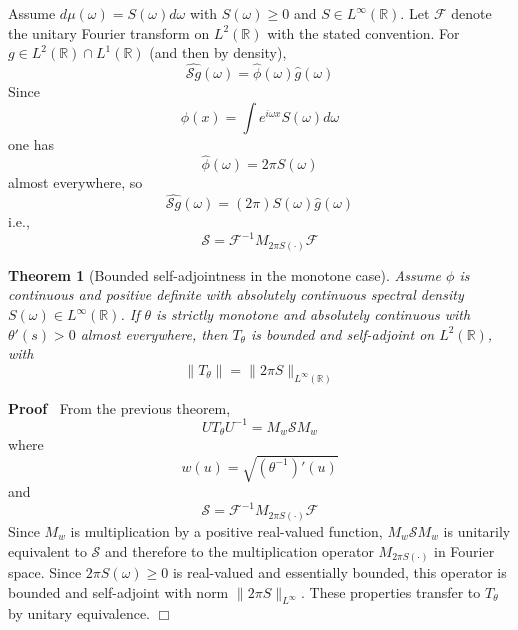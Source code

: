 \documentclass{article}
\newcommand{\cdummy}{\cdot}
\newenvironment{proof}{\noindent\textbf{Proof\ }}{\hspace*{\fill}$\Box$\medskip}
{\theorembodyfont{\rmfamily}\newtheorem{example}{Example}}
\newtheorem{theorem}{Theorem}
\begin{document}
Assume $d \mu (\omega) = S (\omega) d \omega$ with $S (\omega) \ge 0$ and $S
\in L^{\infty} (\mathbb{R})$. Let $\mathcal{F}$ denote the unitary Fourier
transform on $L^2 (\mathbb{R})$ with the stated convention. For $g \in L^2
(\mathbb{R}) \cap L^1 (\mathbb{R})$ (and then by density),
\begin{equation}
  \widehat{\mathcal{S}g} (\omega) = \hat{\phi} (\omega)  \hat{g} (\omega)
\end{equation}
Since
\begin{equation}
  \phi (x) = \int e^{i \omega x} S (\omega) d \omega
\end{equation}
one has
\begin{equation}
  \hat{\phi} (\omega) = 2 \pi S (\omega)
\end{equation}
almost everywhere, so
\begin{equation}
  \widehat{\mathcal{S}g} (\omega) = (2 \pi) S (\omega)  \hat{g} (\omega)
\end{equation}
i.e.,
\begin{equation}
  \mathcal{S}=\mathcal{F}^{- 1} M_{2 \pi S (\cdummy)} \mathcal{F}
\end{equation}
\begin{theorem}[Bounded self-adjointness in the monotone case]
  Assume $\phi$ is continuous and positive definite with absolutely continuous
  spectral density $S (\omega) \in L^{\infty} (\mathbb{R})$. If $\theta$ is
  strictly monotone and absolutely continuous with $\theta' (s) > 0$ almost
  everywhere, then $T_{\theta}$ is bounded and self-adjoint on $L^2
  (\mathbb{R})$, with
  \begin{equation}
    \|T_{\theta} \| = \|2 \pi S\|_{L^{\infty} (\mathbb{R})}
  \end{equation}
\end{theorem}

\begin{proof}
  From the previous theorem,
  \begin{equation}
    UT_{\theta} U^{- 1} = M_w \mathcal{S}M_w
  \end{equation}
  where
  \begin{equation}
    w (u) = \sqrt{(\theta^{- 1})' (u)}
  \end{equation}
  and
  \begin{equation}
    \mathcal{S}=\mathcal{F}^{- 1} M_{2 \pi S (\cdummy)} \mathcal{F}
  \end{equation}
  Since $M_w$ is multiplication by a positive real-valued function, $M_w
  \mathcal{S}M_w$ is unitarily equivalent to $\mathcal{S}$ and therefore to
  the multiplication operator $M_{2 \pi S (\cdummy)}$ in Fourier space. Since
  $2 \pi S (\omega) \geq 0$ is real-valued and essentially bounded, this
  operator is bounded and self-adjoint with norm $\|2 \pi S\|_{L^{\infty}}$.
  These properties transfer to $T_{\theta}$ by unitary equivalence.
\end{proof}
\end{document}
